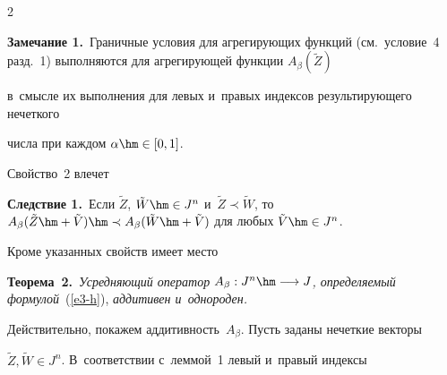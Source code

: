 \begin{multicols}{2}





\noindent


\textbf{Замечание 1.}\ Граничные условия  для агрегирующих функций  (см.\ условие~4 разд.~1) выполняются для агрегирующей функции $A_{\beta}(\tilde{Z})$


 в~смысле их выполнения для  левых и~правых индексов ре\-зуль\-ти\-ру\-юще\-го нечеткого 


чис\-ла при каждом $\alpha\hm\in[0, 1]$.





Свойство~2 влечет





\smallskip





\noindent


\textbf{Следствие 1.}\ Если $\tilde{Z}$, $\tilde{W}\hm\in J^n$ и~$\tilde{Z}\prec 


\tilde{W}$, то $A_{\beta}(\tilde{Z}\hm + \tilde{V})\hm\prec A_{\beta}(\tilde{W} \hm+ 


\tilde{V})$ для любых $\tilde{V}\hm\in J^n$.





\smallskip





Кроме указанных свойств имеет место





\smallskip





\noindent


\textbf{Теорема~2.}\ \textit{Усредняющий оператор $A_{\beta}: J^n\hm\longrightarrow 


J$, определяемый формулой}~(\ref{e3-h}), \textit{аддитивен и~однороден.}





\smallskip





Действительно, покажем аддитивность~$A_{\beta}$. Пусть заданы нечеткие векторы 


$\tilde{Z}, \tilde{W}\in J^n$.  В~соответствии с~леммой~1 левый и~правый индексы 



\end{multicols}

